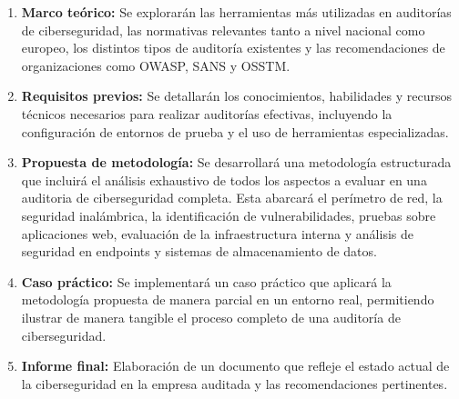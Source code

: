 \documentclass[a4paper, 10pt]{article}
\begin{document}
\begin{enumerate}
    \item \textbf{Marco teórico:} Se explorarán las herramientas más utilizadas en auditorías de ciberseguridad, las normativas relevantes tanto a nivel nacional como europeo, los distintos tipos de auditoría existentes y las recomendaciones de organizaciones como OWASP, SANS y OSSTM.
    
    \item \textbf{Requisitos previos:} Se detallarán los conocimientos, habilidades y recursos técnicos necesarios para realizar auditorías efectivas, incluyendo la configuración de entornos de prueba y el uso de herramientas especializadas.
        
    \item \textbf{Propuesta de metodología:} Se desarrollará una metodología estructurada que incluirá el análisis exhaustivo de todos los aspectos a evaluar en una auditoria de ciberseguridad completa. Esta abarcará el perímetro de red, la seguridad inalámbrica, la identificación de vulnerabilidades, pruebas sobre aplicaciones web, evaluación de la infraestructura interna y análisis de seguridad en endpoints y sistemas de almacenamiento de datos.
    
    \item \textbf{Caso práctico:} Se implementará un caso práctico que aplicará la metodología propuesta de manera parcial en un entorno real, permitiendo ilustrar de manera tangible el proceso completo de una auditoría de ciberseguridad.
    
    \item \textbf{Informe final:} Elaboración de un documento que refleje el estado actual de la ciberseguridad en la empresa auditada y las recomendaciones pertinentes.
\end{enumerate}
\end{document}
